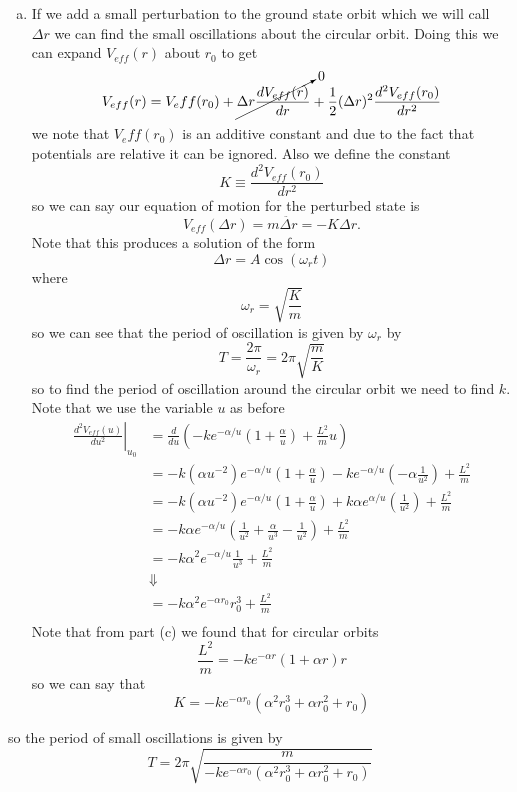 \documentclass[11pt]{article}
\numberwithin{equation}{section}
\begin{document}
\begin{enumerate}[(a)]
\item If we add a small perturbation to the ground state orbit which we will call $\Delta r$
we can find the small oscillations about the circular orbit. Doing this we can expand 
$V_{eff}(r)$ about $r_0$ to get
$$V_{eff}(r) = V_eff(r_0) +\cancelto{0}{\Delta r \frac{dV_{eff}(r)}{dr}} + \frac{1}{2}(\Delta r)^2\frac{d^2V_{eff}(r_0)}{dr^2}$$
we note that $V_eff(r_0)$ is an additive constant and due to the fact that potentials are 
relative it can be ignored. Also we define the constant
$$K \equiv \frac{d^2V_{eff}(r_0)}{dr^2}$$
so we can say our equation of motion for the perturbed state is
$$V_{eff}(\Delta r) = m\ddot{\Delta r} = -K\Delta r.$$
Note that this produces a solution of the form 
$$\Delta r = A\cos(\omega_r t)$$
where
$$\omega_r = \sqrt{\frac{K}{m}}$$
so we can see that the period of oscillation is given by $\omega_r$ by
$$T = \frac{2\pi}{\omega_r} = 2\pi\sqrt{\frac{m}{K}}$$
so to find the period of oscillation around the circular orbit we need to find $k$. Note 
that we use the variable $u$ as before
\begin{align*}
\left.\frac{d^2V_{eff}(u)}{du^2}\right|_{u_0} &= \frac{d}{du}\left(-ke^{-\alpha/u}\left(1 + \frac{\alpha}{u}\right) + \frac{L^2}{m}u\right)\\
&= -k(\alpha u^{-2})e^{-\alpha/u}\left(1 + \frac{\alpha}{u}\right) - ke^{-\alpha/u}\left(-\alpha\frac{1}{u^2}\right) + \frac{L^2}{m}\\
&= -k(\alpha u^{-2})e^{-\alpha/u}\left(1 + \frac{\alpha}{u}\right) + k\alpha e^{\alpha/u}\left(\frac{1}{u^2}\right) + \frac{L^2}{m}\\
&= -k\alpha e^{-\alpha/u}\left(\frac{1}{u^2} + \frac{\alpha}{u^3} - \frac{1}{u^2}\right) + \frac{L^2}{m}\\
&= -k\alpha^2e^{-\alpha/u}\frac{1}{u^3} + \frac{L^2}{m}\\
&\Downarrow\\
&= -k\alpha^2e^{-\alpha r_0}r_0^3 + \frac{L^2}{m}\\
\end{align*}
Note that from part (c) we found that for circular orbits 
$$\frac{L^2}{m} = -ke^{-\alpha r}(1+\alpha r)r$$
so we can say that 
$$K = -ke^{-\alpha r_0}(\alpha^2r_0^3 + \alpha r_0^2 + r_0)$$
\end{enumerate}
so the period of small oscillations is given by
$$T = 2\pi\sqrt{\frac{m}{-ke^{-\alpha r_0}(\alpha^2r_0^3 + \alpha r_0^2 + r_0)}}$$

\pagebreak
\end{document}

